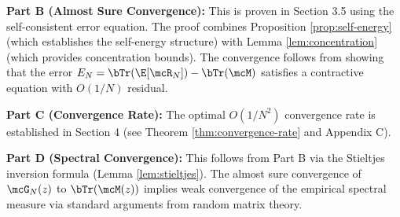 \textbf{Part B (Almost Sure Convergence):} This is proven in Section 3.5 using the self-consistent error equation. The proof combines Proposition \ref{prop:self-energy} (which establishes the self-energy structure) with Lemma \ref{lem:concentration} (which provides concentration bounds). The convergence follows from showing that the error $E_N = \bTr(\E[\mcR_N]) - \bTr(\mcM)$ satisfies a contractive equation with $O(1/N)$ residual.

\textbf{Part C (Convergence Rate):} The optimal $O(1/N^2)$ convergence rate is established in Section 4 (see Theorem \ref{thm:convergence-rate} and Appendix C).

\textbf{Part D (Spectral Convergence):} This follows from Part B via the Stieltjes inversion formula (Lemma \ref{lem:stieltjes}). The almost sure convergence of $\mcG_N(z)$ to $\bTr(\mcM(z))$ implies weak convergence of the empirical spectral measure via standard arguments from random matrix theory.
